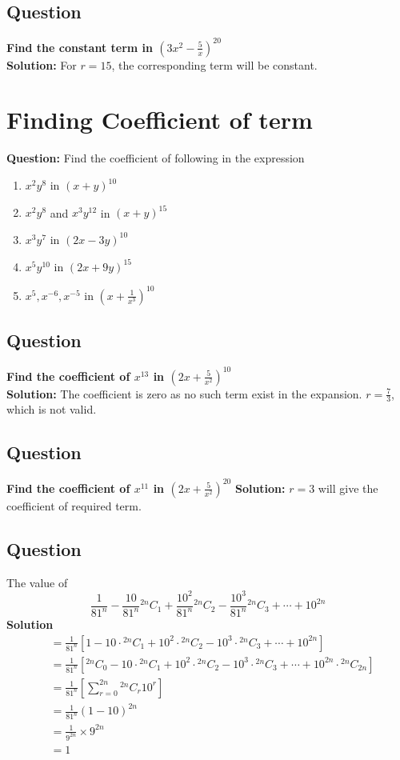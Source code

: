 \documentclass[12pt]{article}
\begin{document}
\subsection*{Question}
\textbf{Find the constant term in $\left(3x^2-\frac{5}{x}\right)^{20}$}\\
\textbf{Solution:} For $r=15$, the corresponding term will be constant.
\newpage
\section{Finding Coefficient of term}
\textbf{Question: }Find the coefficient of following in the expression
\begin{enumerate}
    \item $x^2y^8$ in $(x+y)^{10}$
    \item $x^2y^8$ and $x^3y^{12}$ in $(x+y)^{15}$
    \item $x^3y^7$ in $(2x-3y)^{10}$
    \item $x^5y^10$ in $(2x+9y)^{15}$
    \item $x^5, x^{-6}, x^{-5}$ in $\left(x+ \frac{1}{x^3}\right)^{10}$
\end{enumerate}
\subsection*{Question}
\textbf{Find the coefficient of $x^{13}$ in $\left(2x+\frac{5}{x^2}\right)^{10}$} \\
\textbf{Solution: } The coefficient is zero as no such term exist in the expansion. $r=\frac{7}{3}$, which is not valid.

\subsection*{Question}
\textbf{Find the coefficient of $x^{11}$ in $\left(2x+\frac{5}{x^2}\right)^{20}$}
\textbf{Solution: } $r=3$ will give the coefficient of required term.

\subsection*{Question}
The value of
\[
\frac{1}{81^n}-\frac{10}{81^n}{}^{2n}C_{1}+\frac{10^2}{81^n}{}^{2n}C_{2}-\frac{10^3}{81^n}{}^{2n}C_{3}+\cdots+10^{2n}
\]
\textbf{Solution}
\[
\begin{aligned}
    &=\frac{1}{81^n}\left[1-{10}\cdot{}^{2n}C_{1}+{10^2}\cdot{}^{2n}C_{2}-{10^3}\cdot{}^{2n}C_{3}+\cdots+10^{2n}\right]\\
    &=\frac{1}{81^n}\left[{}^{2n}C_{0}-{10}\cdot{}^{2n}C_{1}+{10^2}\cdot{}^{2n}C_{2}-{10^3}\cdot{}^{2n}C_{3}+\cdots+10^{2n}\cdot{}^{2n}C_{2n}\right]\\
    &=\frac{1}{81^n}\left[\sum_{r=0}^{2n}{}^{2n}C_{r}10^r\right] \\
    &=\frac{1}{81^n}(1-10)^{2n}\\
    &=\frac{1}{9^{2n}}\times9^{2n}\\
    &=1
\end{aligned}
\]
\end{document}
